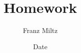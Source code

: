 \documentclass{article}
\begin{document}
\title{Homework}
\author{Franz Miltz}
\date{Date}
\maketitle
\
\end{document}
